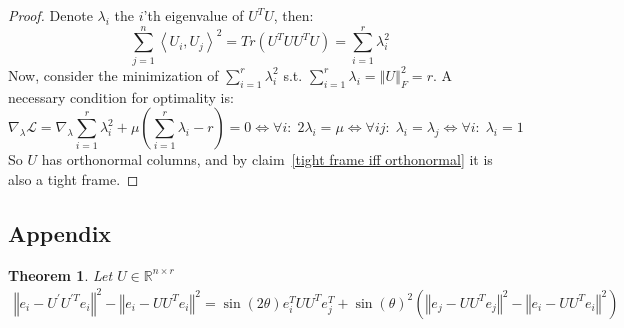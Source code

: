 \documentclass{article}
\newtheorem{theorem}{Theorem}
\newcommand{\claimref}[1]{claim~\ref{#1}}
\begin{document}
\begin{proof}
Denote $\lambda_i$ the $i$'th eigenvalue of $U^TU$, then: 
$$
\sum_{j=1}^{n}\left\langle U_{i},U_{j}\right\rangle ^{2}=Tr(U^TUU^TU)=\sum_{i=1}^r\lambda_i^2
$$
Now, consider the minimization of $\sum_{i=1}^r\lambda_i^2$ s.t. $\sum_{i=1}^r\lambda_i=\left\Vert U\right\Vert _{F}^{2}=r$. A necessary condition for optimality is:
$$
\nabla_\lambda\mathcal{L}=\nabla_\lambda \sum_{i=1}^r\lambda_i^2+\mu(\sum_{i=1}^r\lambda_i-r)=0\Leftrightarrow\forall i:\;2\lambda_i=\mu\Leftrightarrow\forall ij:\;\lambda_i=\lambda_j\Leftrightarrow\forall i:\;\lambda_i=1
$$
So $U$ has orthonormal columns, and by \claimref{tight frame iff orthonormal} it is also a tight frame.
\end{proof}

\subsection{Appendix} \label{technical proof}
\begin{theorem}
Let $U\in\mathbb{R}^{n\times r}$
\begin{align*}
    \left\Vert e_{i}-U^{'}U^{'T}e_{i}\right\Vert ^{2}-\left\Vert e_{i}-UU^{T}e_{i}\right\Vert ^{2}= \sin\left(2\theta\right)e_{i}^{T}UU^{T}e_{j}^{T}+\sin\left(\theta\right)^{2}\left(\left\Vert e_{j}-UU^{T}e_{j}\right\Vert ^{2}-\left\Vert e_{i}-UU^{T}e_{i}\right\Vert ^{2}\right)
\end{align*}
\end{theorem}
\end{document}
